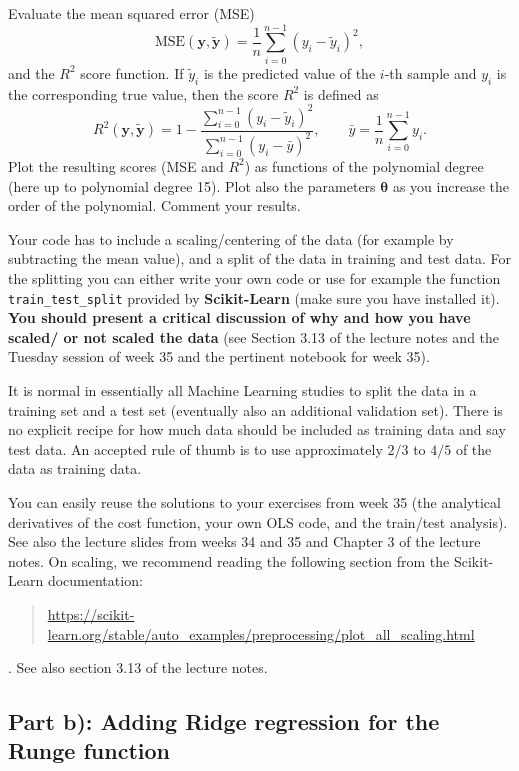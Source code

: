 \documentclass[11pt,a4paper]{article}
\begin{document}
Evaluate the mean squared error (MSE)
\[
  \mathrm{MSE}(\bm{y},\tilde{\bm{y}}) = \frac{1}{n}\sum_{i=0}^{n-1}(y_i-\tilde{y}_i)^2,
\]
and the $R^2$ score function.  If $\tilde{y}_i$ is the predicted value of the
$i$-th sample and $y_i$ is the corresponding true value, then the score $R^2$
is defined as
\[
  R^2(\bm{y},\tilde{\bm{y}}) = 1 - \frac{\sum_{i=0}^{n-1}(y_i-\tilde{y}_i)^2}
                                      {\sum_{i=0}^{n-1}(y_i-\bar{y})^2},
  \qquad
  \bar{y} = \frac{1}{n}\sum_{i=0}^{n-1}y_i .
\]
Plot the resulting scores (MSE and $R^2$) as functions of the polynomial
degree (here up to polynomial degree 15).  Plot also the parameters
$\bm{\theta}$ as you increase the order of the polynomial.  Comment your
results.

Your code has to include a scaling/centering of the data (for example by
subtracting the mean value), and a split of the data in training and test
data.  For the splitting you can either write your own code or use for
example the function \texttt{train\_test\_split} provided by
\textbf{Scikit-Learn} (make sure you have installed it).  \textbf{You should
present a critical discussion of why and how you have scaled/ or not scaled
the data} (see Section 3.13 of the lecture notes and the Tuesday session of
week 35 and the pertinent notebook for week 35).

It is normal in essentially all Machine Learning studies to split the data in
a training set and a test set (eventually also an additional validation
set).  There is no explicit recipe for how much data should be included as
training data and say test data.  An accepted rule of thumb is to use
approximately $2/3$ to $4/5$ of the data as training data.

You can easily reuse the solutions to your exercises from week 35 (the
analytical derivatives of the cost function, your own OLS code, and the
train/test analysis).  See also the lecture slides from weeks 34 and 35 and
Chapter 3 of the lecture notes.  On scaling, we recommend reading the
following section from the Scikit-Learn documentation:
\begin{quote}\small
\url{https://scikit-learn.org/stable/auto_examples/preprocessing/plot_all_scaling.html}
\end{quote}. See also section 3.13 of the lecture notes.

\subsection*{Part b): Adding Ridge regression for the Runge function}
\end{document}
